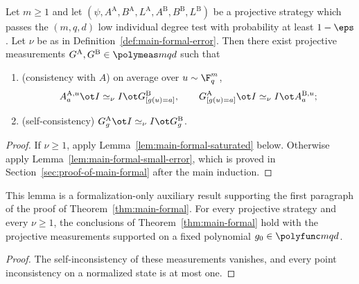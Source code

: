\begin{theorem}\label{thm:main-formal}
	\leanok
	Let $m\ge1$ and let
	$(\psi,A^{\mathrm A},B^{\mathrm A},L^{\mathrm A},A^{\mathrm B},B^{\mathrm B},L^{\mathrm B})$
	be a projective strategy which passes the $(m,q,d)$ low individual degree
	test with probability at least $1-\eps$.  Let $\nu$ be as in
	Definition~\ref{def:main-formal-error}.  Then there exist projective
	measurements $G^{\mathrm A},G^{\mathrm B}\in\polymeas mqd$ such that
	\begin{enumerate}
		\item (consistency with $A$) on average over $u\sim\F_q^m$,
		      \[
			      A^{\mathrm A,u}_a\ot I\simeq_\nu I\ot G^{\mathrm B}_{[g(u)=a]},
			      \qquad
			      G^{\mathrm A}_{[g(u)=a]}\ot I\simeq_\nu I\ot A^{\mathrm B,u}_a;
		      \]
		\item (self-consistency)
		      $G^{\mathrm A}_g\ot I\simeq_\nu I\ot G^{\mathrm B}_g$.
	\end{enumerate}
\end{theorem}

\begin{proof}
	\leanok
	If $\nu\ge1$, apply Lemma~\ref{lem:main-formal-saturated} below.
	Otherwise apply Lemma~\ref{lem:main-formal-small-error}, which is proved
	in Section~\ref{sec:proof-of-main-formal} after the main induction.
\end{proof}



\begin{lemma}\label{lem:main-formal-saturated}
	\leanok
	This lemma is a formalization-only auxiliary result supporting the first
	paragraph of the proof of Theorem~\ref{thm:main-formal}.  For every
	projective strategy and every $\nu\ge1$, the conclusions of
	Theorem~\ref{thm:main-formal} hold with the projective measurements
	supported on a fixed polynomial $g_0\in\polyfunc mqd$.
\end{lemma}
\begin{proof}
	\leanok
	The self-inconsistency of these measurements vanishes, and every point
	inconsistency on a normalized state is at most one.
\end{proof}

